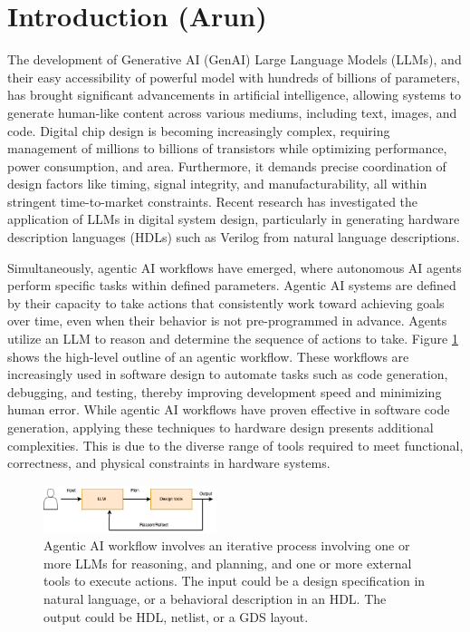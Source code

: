 \section{Introduction (Arun)}
\label{sec:introduction}

The development of Generative AI (GenAI) Large Language Models (LLMs), and their easy accessibility of powerful model with hundreds of billions of parameters,  has brought significant advancements in artificial intelligence, allowing systems to generate human-like content across various mediums, including text, images, and code. Digital chip design is becoming increasingly complex, requiring management of millions to billions of transistors while optimizing performance, power consumption, and area. Furthermore, it demands precise coordination of design factors like timing, signal integrity, and manufacturability, all within stringent time-to-market constraints. Recent research has investigated the application of LLMs in digital system design, particularly in generating hardware description languages (HDLs) such as Verilog from natural language descriptions. 

Simultaneously, agentic AI workflows have emerged, where autonomous AI agents perform specific tasks within defined parameters. Agentic AI systems are defined by their capacity to take actions that consistently work toward achieving goals over time, even when their behavior is not pre-programmed in advance. Agents utilize an LLM to reason and determine the sequence of actions to take. Figure \ref{fig:agenttic_overview} shows the high-level outline of an agentic workflow.  These workflows are increasingly used in software design to automate tasks such as code generation, debugging, and testing, thereby improving development speed and minimizing human error. While agentic AI workflows have proven effective in software code generation, applying these techniques to hardware design presents additional complexities. This is due to the diverse range of tools required to meet functional, correctness, and physical constraints in hardware systems.


\begin{figure}[htbp]
	\includegraphics[width=0.45\textwidth]{figs/agentic_overview.png}
	\caption{Agentic AI workflow involves an iterative process involving one or more LLMs for reasoning, and planning, and one or more external tools to execute actions. The input could be a design specification in natural language, or a behavioral description in an HDL. The output could be HDL, netlist, or a GDS layout.
}
	\label{fig:agenttic_overview}
\end{figure}

